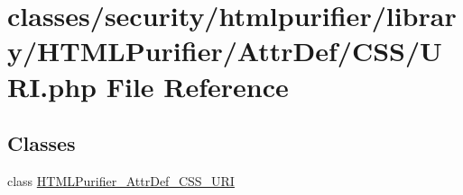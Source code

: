 \hypertarget{AttrDef_2CSS_2URI_8php}{\section{classes/security/htmlpurifier/library/\+H\+T\+M\+L\+Purifier/\+Attr\+Def/\+C\+S\+S/\+U\+R\+I.php File Reference}
\label{AttrDef_2CSS_2URI_8php}
}
\subsection*{Classes}
\begin{DoxyCompactItemize}
\item 
class \hyperlink{classHTMLPurifier__AttrDef__CSS__URI}{H\+T\+M\+L\+Purifier\+\_\+\+Attr\+Def\+\_\+\+C\+S\+S\+\_\+\+U\+R\+I}
\end{DoxyCompactItemize}
